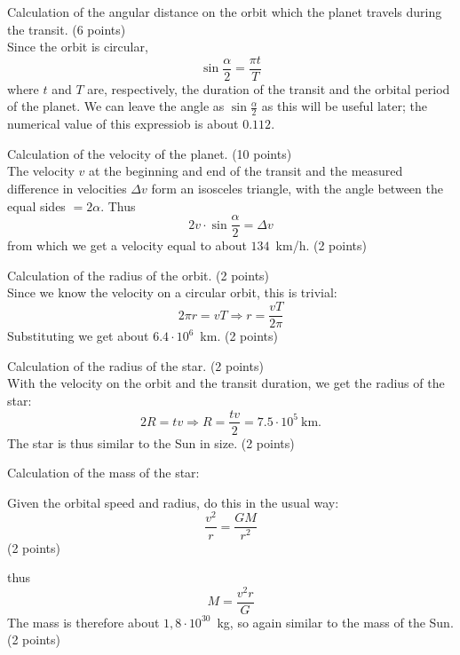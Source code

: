 Calculation of the angular distance on the orbit which the planet travels
during the transit. \hfill(6 points)\\
Since the orbit is circular,
\[ \sin\frac{\alpha}{2} = \frac{\pi t}{T} \]
where $t$ and $T$ are, respectively, the duration of the transit and the
orbital period of the planet. We can leave the angle as $\sin\frac{\alpha}{2}$
as this will be useful later; the numerical value of this
expressiob %
is about $0.112$.

Calculation of the velocity of the planet. \hfill(10 points)\\
The velocity $v$ at the beginning and end of the transit and the measured
difference in velocities $\Delta v$ form an isosceles triangle, with the angle
between the equal sides $= 2\alpha$. Thus
\[ 2v\cdot\sin\frac{\alpha}{2} = \Delta v \]
from which we get a velocity equal to about $134$~km/h.
\hfill(2 points)

Calculation of the radius of the orbit. \hfill(2 points)\\
Since we know the velocity on a circular orbit, this is trivial:
\[ 2\pi r = vT \Rightarrow r = \frac{vT}{2\pi} \]
Substituting we get about $6.4\cdot10^{6}$~km. \hfill(2 points)

Calculation of the radius of the star. \hfill(2 points)\\
With the velocity on the orbit and the transit duration, we get the radius of
the star:
\[ 2R = tv \Rightarrow R = \frac{tv}{2} = 7.5\cdot10^{5}\ \mathrm{km}. \]
The star is thus similar to the Sun in size. \hfill(2 points)

Calculation of the mass of the %
star:

Given the orbital speed and radius, do this in the usual way:
\[ \frac{v^2}{r} = \frac{GM}{r^2} \]
\hfill(2 points)

thus
\[ M = \frac{v^2 r}{G} \]
The mass is therefore about $1{,}8\cdot10^{30}$~kg, so again similar to the
mass of the Sun. \hfill(2 points)

